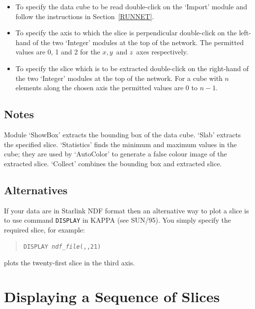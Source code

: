 \documentclass[twoside,11pt]{article}
\newcommand{\xref}[3]{#1}
\newcommand{\xlabel}[1]{}
\begin{document}
\begin{itemize}

  \item To specify the data cube to be read double-click on the `Import'
   module and follow the instructions in Section~\ref{RUNNET}.

  \item To specify the axis to which the slice is perpendicular
   double-click on the left-hand of the two `Integer' modules at the
   top of the network. The permitted values are 0, 1 and 2 for the
   $x, y$\, and  $z$\, axes respectively.

  \item To specify the slice which is to be extracted double-click on
   the right-hand of the two `Integer' modules at the top of the
   network. For a cube with $n$\, elements along the chosen axis the
   permitted values are 0 to $n-1$.

\end{itemize}

\subsection{Notes}

Module `ShowBox' extracts the bounding box of the data cube. `Slab'
extracts the specified slice. `Statistics' finds the minimum and
maximum values in the cube; they are used by `AutoColor' to generate
a false colour image of the extracted slice. `Collect' combines the
bounding box and extracted slice.

\subsection{Alternatives}

If your data are in Starlink NDF format then an alternative way to
plot a slice is to use command \xref{{\tt DISPLAY}}{sun95}{DISPLAY} in KAPPA
(see \xref{SUN/95}{sun95}{}\cite{SUN95}).  You simply specify the required
slice, for example:

\begin{quote}
{\tt DISPLAY~{\it ndf\_file}(,,21)}
\end{quote}

plots the twenty-first slice in the third axis.

\newpage
\section{\xlabel{ASLICNET}Displaying a Sequence of Slices}
\end{document}
